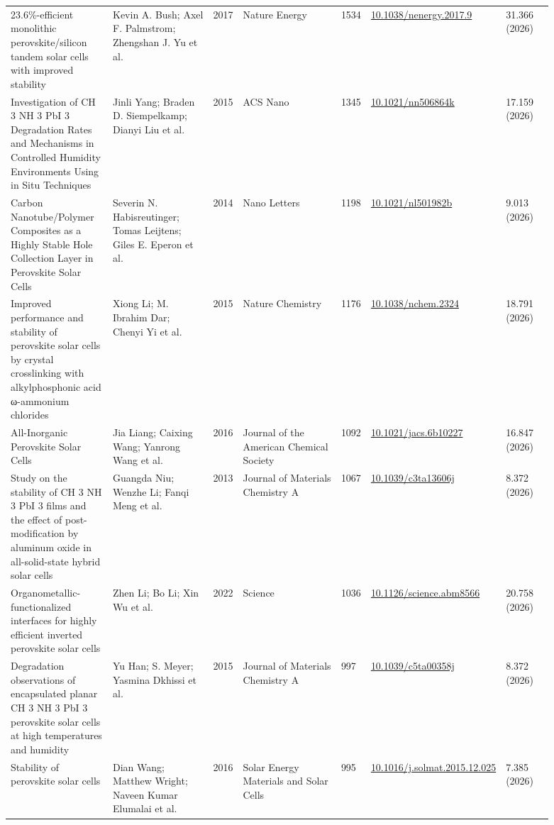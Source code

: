 \documentclass[10pt,a4paper]{article}
\begin{document}
{\begin{longtable}{p{0.197\linewidth}p{0.197\linewidth}p{0.043\linewidth}p{0.197\linewidth}p{0.043\linewidth}p{0.117\linewidth}p{0.098\linewidth}}
23.6\%-efficient monolithic perovskite/silicon tandem solar cells with improved stability & Kevin A. Bush; Axel F. Palmstrom; Zhengshan J. Yu et al. & 2017 & Nature Energy & 1534 & \href{https://doi.org/10.1038/nenergy.2017.9}{10.1038/nenergy.2017.9} & 31.366 (2026) \\
Investigation of CH 3 NH 3 PbI 3 Degradation Rates and Mechanisms in Controlled Humidity Environments Using in Situ Techniques & Jinli Yang; Braden D. Siempelkamp; Dianyi Liu et al. & 2015 & ACS Nano & 1345 & \href{https://doi.org/10.1021/nn506864k}{10.1021/nn506864k} & 17.159 (2026) \\
Carbon Nanotube/Polymer Composites as a Highly Stable Hole Collection Layer in Perovskite Solar Cells & Severin N. Habisreutinger; Tomas Leijtens; Giles E. Eperon et al. & 2014 & Nano Letters & 1198 & \href{https://doi.org/10.1021/nl501982b}{10.1021/nl501982b} & 9.013 (2026) \\
Improved performance and stability of perovskite solar cells by crystal crosslinking with alkylphosphonic acid ω-ammonium chlorides & Xiong Li; M. Ibrahim Dar; Chenyi Yi et al. & 2015 & Nature Chemistry & 1176 & \href{https://doi.org/10.1038/nchem.2324}{10.1038/nchem.2324} & 18.791 (2026) \\
All-Inorganic Perovskite Solar Cells & Jia Liang; Caixing Wang; Yanrong Wang et al. & 2016 & Journal of the American Chemical Society & 1092 & \href{https://doi.org/10.1021/jacs.6b10227}{10.1021/jacs.6b10227} & 16.847 (2026) \\
Study on the stability of CH 3 NH 3 PbI 3 films and the effect of post-modification by aluminum oxide in all-solid-state hybrid solar cells & Guangda Niu; Wenzhe Li; Fanqi Meng et al. & 2013 & Journal of Materials Chemistry A & 1067 & \href{https://doi.org/10.1039/c3ta13606j}{10.1039/c3ta13606j} & 8.372 (2026) \\
Organometallic-functionalized interfaces for highly efficient inverted perovskite solar cells & Zhen Li; Bo Li; Xin Wu et al. & 2022 & Science & 1036 & \href{https://doi.org/10.1126/science.abm8566}{10.1126/science.abm8566} & 20.758 (2026) \\
Degradation observations of encapsulated planar CH 3 NH 3 PbI 3 perovskite solar cells at high temperatures and humidity & Yu Han; S. Meyer; Yasmina Dkhissi et al. & 2015 & Journal of Materials Chemistry A & 997 & \href{https://doi.org/10.1039/c5ta00358j}{10.1039/c5ta00358j} & 8.372 (2026) \\
Stability of perovskite solar cells & Dian Wang; Matthew Wright; Naveen Kumar Elumalai et al. & 2016 & Solar Energy Materials and Solar Cells & 995 & \href{https://doi.org/10.1016/j.solmat.2015.12.025}{10.1016/j.solmat.2015.12.025} & 7.385 (2026) \\

\end{longtable}}
\end{document}
